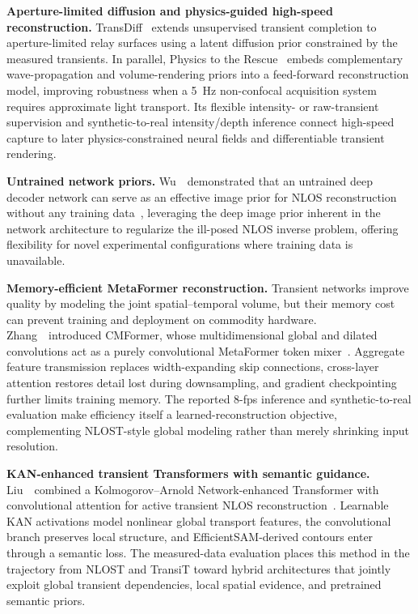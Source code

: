 \vspace{0.8mm}
\noindent \textbf{Aperture-limited diffusion and physics-guided high-speed reconstruction.}
TransDiff~\cite{cuiTransDiffTIP2025} extends unsupervised transient completion to aperture-limited relay surfaces using a latent diffusion prior constrained by the measured transients. In parallel, Physics to the Rescue~\cite{muPhysicsRescueTPAMI2025} embeds complementary wave-propagation and volume-rendering priors into a feed-forward reconstruction model, improving robustness when a 5~Hz non-confocal acquisition system requires approximate light transport. Its flexible intensity- or raw-transient supervision and synthetic-to-real intensity/depth inference connect high-speed capture to later physics-constrained neural fields and differentiable transient rendering.

\vspace{0.8mm}
\noindent \textbf{Untrained network priors.}
Wu~\etal~demonstrated that an untrained deep decoder network can serve as an effective image prior for NLOS reconstruction without any training data~\cite{wuUntrainedDecoder2022}, leveraging the deep image prior inherent in the network architecture to regularize the ill-posed NLOS inverse problem, offering flexibility for novel experimental configurations where training data is unavailable.


\vspace{0.8mm}
\noindent \textbf{Memory-efficient MetaFormer reconstruction.}
Transient networks improve quality by modeling the joint spatial--temporal volume, but their memory cost can prevent training and deployment on commodity hardware. Zhang~\etal~introduced CMFormer, whose multidimensional global and dilated convolutions act as a purely convolutional MetaFormer token mixer~\cite{zhangCMFormerNLOS2025}. Aggregate feature transmission replaces width-expanding skip connections, cross-layer attention restores detail lost during downsampling, and gradient checkpointing further limits training memory. The reported 8-fps inference and synthetic-to-real evaluation make efficiency itself a learned-reconstruction objective, complementing NLOST-style global modeling rather than merely shrinking input resolution.

\vspace{0.8mm}
\noindent \textbf{KAN-enhanced transient Transformers with semantic guidance.}
Liu~\etal~combined a Kolmogorov--Arnold Network-enhanced Transformer with convolutional attention for active transient NLOS reconstruction~\cite{liuKANTransformerNLOS2025}. Learnable KAN activations model nonlinear global transport features, the convolutional branch preserves local structure, and EfficientSAM-derived contours enter through a semantic loss. The measured-data evaluation places this method in the trajectory from NLOST and TransiT toward hybrid architectures that jointly exploit global transient dependencies, local spatial evidence, and pretrained semantic priors.


